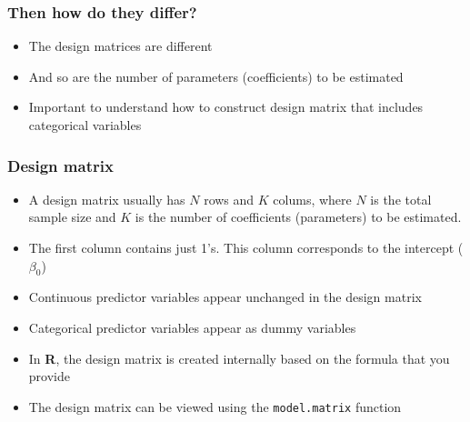 \documentclass[color=usenames,dvipsnames]{beamer}\usepackage[]{graphicx}\usepackage[]{color}
\begin{document}
\begin{frame}
  \frametitle{Then how do they differ?}
  \pause
  \large
  \begin{itemize}[<+->]
    \item The design matrices are different
    \item And so are the number of parameters (coefficients) to be
      estimated
    \item Important to understand how to construct design matrix that
      includes categorical variables
  \end{itemize}
\end{frame}




\begin{frame}%
  \frametitle{Design matrix}
  \large
  \begin{itemize}[<+->]
    \item A design matrix usually has $N$ rows and $K$ colums, where $N$ is
      the total sample size and $K$ is the number of coefficients (parameters)
      to be estimated.
    \item The first column contains just 1's. This column corresponds
      to the intercept ($\beta_0$)
    \item Continuous predictor variables appear unchanged in the design matrix
    \item Categorical predictor variables appear as dummy variables
    \item In {\bf R}, the design matrix is created internally based on
      the formula that you provide
    \item The design matrix can be viewed using the {\tt model.matrix} function
  \end{itemize}
\end{frame}
\end{document}
